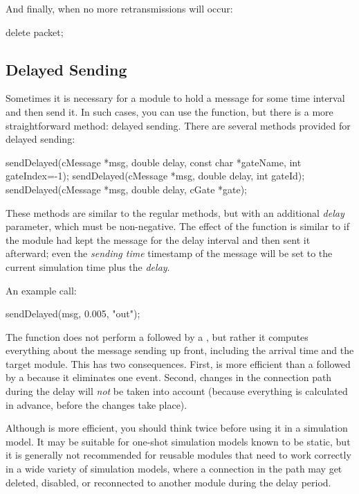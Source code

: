 And finally, when no more retransmissions will occur:

\begin{cpp}
delete packet;
\end{cpp}


\subsection{Delayed Sending}
\label{sec:simple-modules:delayed-sending}

Sometimes it is necessary for a module to hold a message for some time interval
and then send it. In such cases, you can use the  function,
but there is a more straightforward method: delayed sending.
There are several methods provided for delayed sending:

\begin{cpp}
sendDelayed(cMessage *msg, double delay, const char *gateName, int gateIndex=-1);
sendDelayed(cMessage *msg, double delay, int gateId);
sendDelayed(cMessage *msg, double delay, cGate *gate);
\end{cpp}

These methods are similar to the regular  methods, but with an
additional \textit{delay} parameter, which must be non-negative. The effect of
the function is similar to if the module had kept the message for the delay
interval and then sent it afterward; even the \textit{sending time} timestamp
of the message will be set to the current simulation time plus the \textit{delay}.

An example call:

\begin{cpp}
sendDelayed(msg, 0.005, "out");
\end{cpp}

The  function does not perform a 
followed by a , but rather it computes everything about the
message sending up front, including the arrival time and the target module.
This has two consequences. First,  is more efficient than
a  followed by a  because it eliminates one
event. Second, changes in the connection path during the delay will \textit{not}
be taken into account (because everything is calculated in advance, before the
changes take place).

\begin{note}
  Although  is more efficient, you should think twice
  before using it in a simulation model. It may be suitable for one-shot simulation
  models known to be static, but it is generally not recommended for reusable
  modules that need to work correctly in a wide variety of simulation models,
where a connection in the path may get deleted, disabled, or reconnected to
another module during the delay period.
\end{note}


